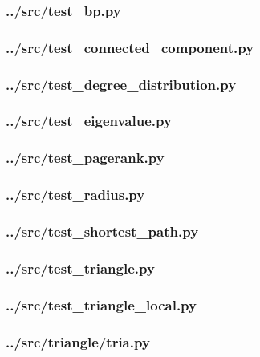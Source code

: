 \subsubsection{../src/test\_bp.py}

\subsubsection{../src/test\_connected\_component.py}

\subsubsection{../src/test\_degree\_distribution.py}

\subsubsection{../src/test\_eigenvalue.py}

\subsubsection{../src/test\_pagerank.py}

\subsubsection{../src/test\_radius.py}

\subsubsection{../src/test\_shortest\_path.py}

\subsubsection{../src/test\_triangle.py}

\subsubsection{../src/test\_triangle\_local.py}

\subsubsection{../src/triangle/tria.py}

